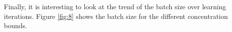 Finally, it is interesting to look at the trend of the batch size over learning iterations. Figure \ref{fig:8} shows the batch size for the different concentration bounds.

\begin{figure}[h!]
\begin{adjustbox}{left}
\end{adjustbox}
\begin{adjustbox}{left}
\end{adjustbox}
\begin{adjustbox}{left}
\end{adjustbox}
\end{figure}
